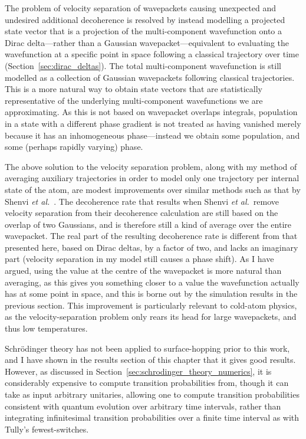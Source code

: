 The problem of velocity separation of wavepackets causing unexpected and undesired additional decoherence is resolved by instead modelling a projected state vector that is a projection of the multi-component wavefunction onto a Dirac delta---rather than a Gaussian wavepacket---equivalent to evaluating the wavefunction at a specific point in space following a classical trajectory over time (Section~\ref{sec:dirac_deltas}). The total multi-component wavefunction is still modelled as a collection of Gaussian wavepackets following classical trajectories. This is a more natural way to obtain state vectors that are statistically representative of the underlying multi-component wavefunctions we are approximating. As this is not based on wavepacket overlaps integrals, population in a state with a different phase gradient is not treated as having vanished merely because it has an inhomogeneous phase---instead we obtain some population, and some (perhaps rapidly varying) phase.

The above solution to the velocity separation problem, along with my method of averaging auxiliary trajectories in order to model only one trajectory per internal state of the atom, are modest improvements over similar methods such as that by Shenvi \emph{et al.}~\cite{doi:10.1063/1.3575588}. The decoherence rate that results when Shenvi \emph{et al.}~remove velocity separation from their decoherence calculation are still based on the overlap of two Gaussians, and is therefore still a kind of average over the entire wavepacket. The real part of the resulting decoherence rate is different from that presented here, based on Dirac deltas, by a factor of two, and lacks an imaginary part (velocity separation in my model still causes a phase shift). As I have argued, using the value at the centre of the wavepacket is more natural than averaging, as this gives you something closer to a value the wavefunction actually has at some point in space, and this is borne out by the simulation results in the previous section. This improvement is particularly relevant to cold-atom physics, as the velocity-separation problem only rears its head for large wavepackets, and thus low temperatures.

Schr\"odinger theory has not been applied to surface-hopping prior to this work, and I have shown in the results section of this chapter that it gives good results. However, as discussed in Section~\ref{sec:schrodinger_theory_numerics}, it is considerably expensive to compute transition probabilities from, though it can take as input arbitrary unitaries, allowing one to compute transition probabilities consistent with quantum evolution over arbitrary time intervals, rather than integrating infinitesimal transition probabilities over a finite time interval as with Tully's fewest-switches. 

